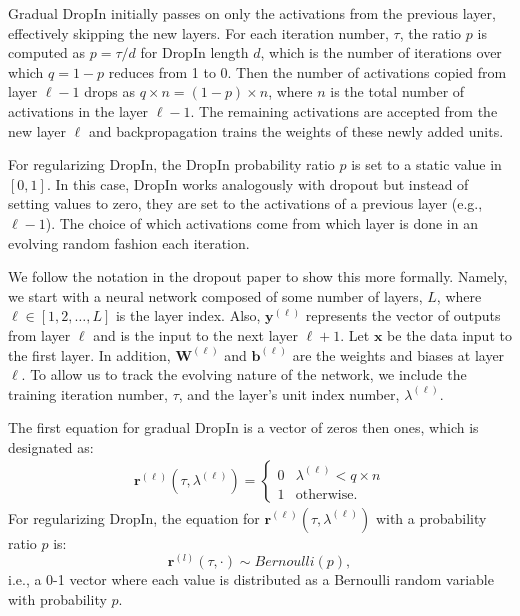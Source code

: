 \documentclass[10pt,twocolumn,letterpaper]{article}
\newcommand{\dropin}{DropIn }
\newcommand{\dropinNS}{DropIn}
\begin{document}
Gradual \dropin initially passes on only the activations from the previous layer, effectively skipping the new layers.  
For each iteration number, $\tau$, the ratio $ p $ is computed as $ p = \tau / d$ for \dropin length $d$, which is the number of iterations over which $q = 1 - p$ reduces from 1 to 0. 
Then the number of activations copied from layer $ {\ell-1} $ drops as  $ q \times n = (1 - p) \times n $, where $n$ is the total number of activations in the layer ${\ell-1}$.  
The remaining activations are accepted from the new layer $ {\ell} $ and backpropagation trains the weights of these newly added units.

For regularizing \dropinNS, the \dropin probability ratio $p$ is set to a static value in $[0,1]$.
In this case, \dropin works analogously with dropout but instead of setting values to zero, they are set to the activations of a previous layer (e.g., $ {\ell-1} $).
The choice of which activations come from which layer is done in an evolving random fashion each iteration.

We follow the notation in the dropout paper \cite{srivastava2014dropout} to show this more formally.
Namely, we start with a neural network composed of some number of layers, $L$, where $ \ell \in [1, 2, \dots, L] $ is the layer index.
Also, $ \mathbf{y}^{(\ell)} $ represents the vector of outputs from layer $ {\ell} $ and is the input to the next layer $ {\ell+1} $.  Let $ \mathbf{x} $ be the data input to the first layer. 
In addition, $ \mathbf{W}^{(\ell)} $ and $ \mathbf{b}^{(\ell)} $ are the weights and biases at layer $ \ell $.  
To allow us to track the evolving nature of the network, we include the training iteration number, $\tau$, and the layer's unit index number, $\lambda^{(\ell)}$.

The first equation for gradual \dropin is a vector of zeros then ones, which is designated as: 
\begin{eqnarray}
\mathbf{r}^{(\ell)}(\tau,\lambda^{(\ell)}) =\begin{cases} 0 &\lambda^{(\ell)}< q \times n \\
1 & \mbox{otherwise}.
\end{cases}\end{eqnarray}
For regularizing \dropinNS, the  equation for $ \mathbf{r}^{(\ell)}(\tau, \lambda^{(\ell)})$ with a probability ratio $ p $ is:
\begin{equation}
\mathbf{r}^{(l)}(\tau,\cdot) \sim Bernoulli(p), 
\end{equation}
i.e.,  a 0-1 vector where each value is distributed as a Bernoulli random variable with probability $p$.  
\end{document}

